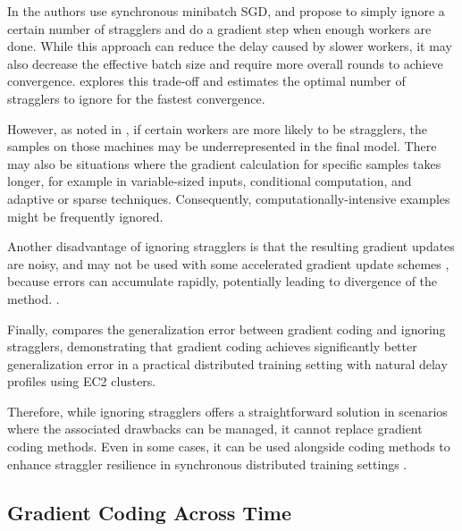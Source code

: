 In \cite{chen2016revisiting} the authors use synchronous minibatch SGD, and propose to simply ignore a certain number of stragglers and do a gradient step when enough workers are done.
While this approach can reduce the delay caused by slower workers, it may also decrease the effective batch size and require more overall rounds to achieve convergence. \cite{chen2016revisiting} explores this trade-off and estimates the optimal number of stragglers to ignore for the fastest convergence.

However, as noted in \cite{grad_coding}, if certain workers are more likely to be stragglers, the samples on those machines may be underrepresented in the final model. There may also be situations where the gradient calculation for specific samples takes longer, for example in variable-sized inputs, conditional computation, and adaptive or sparse techniques. Consequently, computationally-intensive examples might be frequently ignored.

Another disadvantage of ignoring stragglers is that the resulting gradient updates are noisy, and may not be used with some accelerated gradient update schemes \cite{grad_coding}, because errors can accumulate rapidly, potentially leading to divergence of the method. \cite{devolder2014first}. 

Finally, \cite{grad_coding} compares the generalization error between gradient coding and ignoring stragglers, demonstrating that gradient coding achieves significantly better generalization error in a practical distributed training setting with natural delay profiles using EC2 clusters.

Therefore, while ignoring stragglers offers a straightforward solution in scenarios where the associated drawbacks can be managed, it cannot replace gradient coding methods. Even in some cases, it can be used alongside coding methods to enhance straggler resilience in synchronous distributed training settings \cite{su2023arbitrary}.

\subsection{Gradient Coding Across Time}

